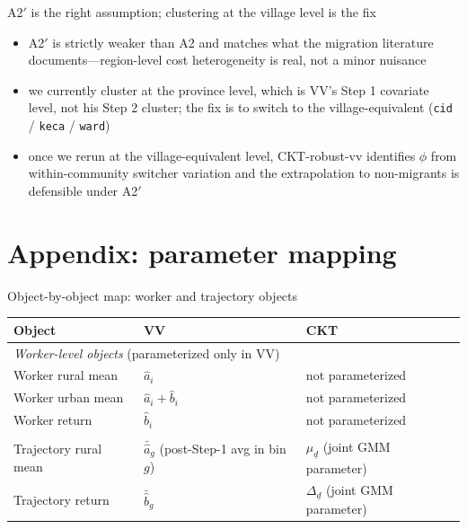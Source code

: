 \documentclass[10pt,aspectratio=169]{beamer}
\newcommand{\phicoef}{\phi}
\newcommand{\mud}{\mu_{\underline{d}}}
\newcommand{\Deltad}{\Delta_{\underline{d}}}
\begin{document}
\begin{frame}{A2$'$ is the right assumption; clustering at the village level is the fix}

  \begin{itemize}
    \item A2$'$ is strictly weaker than A2 and matches what the migration literature documents---region-level cost heterogeneity is real, not a minor nuisance
    \item we currently cluster at the province level, which is VV's Step 1 covariate level, not his Step 2 cluster; the fix is to switch to the village-equivalent (\texttt{cid} / \texttt{keca} / \texttt{ward})
    \item once we rerun at the village-equivalent level, CKT-robust-vv identifies $\phicoef$ from within-community switcher variation and the extrapolation to non-migrants is defensible under A2$'$
  \end{itemize}

\end{frame}

\section{Appendix: parameter mapping}

\begin{frame}{Object-by-object map: worker and trajectory objects}

  \begin{center}
  \begin{tabular}{p{4.0cm}p{4.5cm}p{4.5cm}}
    \toprule
    Object & VV & CKT \\
    \midrule
    \multicolumn{3}{l}{\emph{Worker-level objects} (parameterized only in VV)} \\
    Worker rural mean                  & $\hat a_i$                            & not parameterized                                  \\
    Worker urban mean                  & $\hat a_i + \hat b_i$                  & not parameterized                                  \\
    Worker return                      & $\hat b_i$                            & not parameterized                                  \\
    \addlinespace
    \multicolumn{3}{l}{\emph{Trajectory-level objects} (CKT's natural level)} \\
    Trajectory rural mean              & $\bar{\hat a}_g$ (post-Step-1 avg in bin $g$) & $\mud$ (joint GMM parameter) \\
    Trajectory return                  & $\bar{\hat b}_g$                       & $\Deltad$ (joint GMM parameter) \\
    \bottomrule
  \end{tabular}
  \end{center}

\end{frame}
\end{document}
